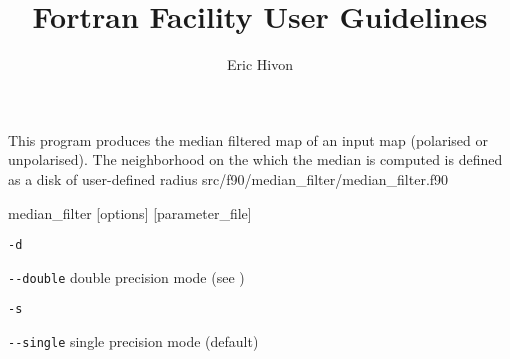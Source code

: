 
\sloppy


\title{\healpix Fortran Facility User Guidelines}
 \section[median\_filter]{\nosectionname}
\label{fac:median_filter}
\author{Eric Hivon}

\begin{facility}
{This program produces the median filtered map of an input \healpix map
  (polarised or unpolarised). The
  neighborhood on the which the median is computed is defined as a disk of
  user-defined radius}
{src/f90/median\_filter/median\_filter.f90}
\end{facility}

\begin{f90facility}
{median\_filter [options] [parameter\_file]}
\end{f90facility}

\begin{options}
  \begin{optionlistwide}{} %
    \item[{\tt -d}]
    \item[{\tt -}{\tt -}{\tt double}] double precision mode (see 
)
    \item[{\tt -s}]
    \item[{\tt -}{\tt -}{\tt single}] single precision mode (default)
  \end{optionlistwide}
\end{options}

